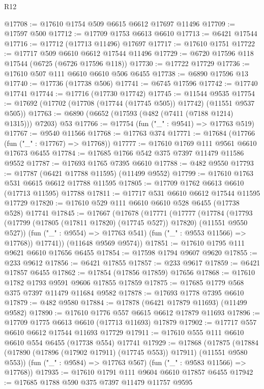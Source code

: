 \begin{lexlean}{R12}
\begin{coremodule}
{{{{{{{{{{{{{{{{{{{{{{{{{{{{{{{{{{{{{{{{{{{{{{{{{{{{{{{{{{{{{{{{{{{{{{{{{{{{{{{{{{@17708 := @17610 @1754 @509 @6615 @6612 @17697 @11496
@17709 := @17597 @500
@17712 := @17709 @1753 @6613 @6610
@17713 := @6421 @17544
@17716 := @17712 (@17713 @11496) @17697
@17717 := @17610 @1751
@17722 := @17717 @509 @6610 @6612 @17544 @11496
@17729 := @6720 @17596 @118 @17544 (@6725 (@6726 @17596 @118))
@17730 := @17722 @17729
@17736 := @17610 @507 @111 @6610 @6610 @506 @6455
@17738 := @6890 @17596 @13
@17740 := @17736 (@17738 @506)
@17741 := @6745 @17596
@17742 := @17740 @17741
@17744 := @17716 (@17730 @17742)
@17745 := @11544 @9535
@17754 := @17692 (@17702 (@17708 (@17744 (@17745 @505)) @17742) (@11551 @9537 @505))
@17763 := @6890 (@6652 (@17593 (@482 (@7411 (@7188 @1214) @1315))) @7203) @53
@17766 := @17754 (fun ("_" : @9541) => @17763 @519)
@17767 := @9540 @11566
@17768 := @17763 @374
@17771 := @17684 (@17766 (fun ("_" : @17767) => @17768))
@17777 := @17610 @1769 @111 @9561 @6610 @17673 @6455
@17784 := @17685 @1766 @542 @375 @7397 @11479 @11586 @9552
@17787 := @17693 @1765 @7395 @6610
@17788 := @482 @9550
@17793 := @17787 (@6421 @17788 @11595) (@11499 @9552)
@17799 := @17610 @1763 @531 @6615 @6612 @17788 @11595
@17805 := @17709 @1762 @6613 @6610 (@17713 @11595) @17788
@17811 := @17717 @531 @6610 @6612 @17544 @11595 @17729
@17820 := @17610 @529 @111 @6610 @6610 @528 @6455 (@17738 @528) @17741
@17845 := @17667
    (@17678
      (@17771
        (@17777
          (@17784
            (@17793 (@17799 (@17805 (@17811 @17820) (@17745 @527)) @17820) (@11551 @9550 @527))
            (fun ("_" : @9554) => @17763 @541)
            (fun ("_" : @9553 @11566) => @17768))
          @17741))
      (@11648 @9569 @9574))
@17851 := @17610 @1795 @111 @9621 @6610 @17656 @6455
@17854 := @17598 @1794 @9607 @9620
@17855 := @233 @9612
@17856 := @6421 @17855
@17857 := @233 @9617
@17859 := @6421 @17857 @6455
@17862 := @17854 (@17856 @17859) @17656
@17868 := @17610 @1782 @1793 @9591 @9606 @17855 @17859
@17875 := @17685 @1779 @568 @375 @7397 @11479 @11684 @9582
@17878 := @17693 @1778 @7395 @6610
@17879 := @482 @9580
@17884 := @17878 (@6421 @17879 @11693) (@11499 @9582)
@17890 := @17610 @1776 @557 @6615 @6612 @17879 @11693
@17896 := @17709 @1775 @6613 @6610 (@17713 @11693) @17879
@17902 := @17717 @557 @6610 @6612 @17544 @11693 @17729
@17911 := @17610 @555 @111 @6610 @6610 @554 @6455 (@17738 @554) @17741
@17929 := @17868
    (@17875
      (@17884 (@17890 (@17896 (@17902 @17911) (@17745 @553)) @17911) (@11551 @9580 @553))
      (fun ("_" : @9584) => @17763 @567)
      (fun ("_" : @9583 @11566) => @17768))
@17935 := @17610 @1791 @111 @9604 @6610 @17857 @6455
@17942 := @17685 @1788 @590 @375 @7397 @11479 @11757 @9595
}}}}}}}}}}}}}}}}}}}}}}}}}}}}}}}}}}}}}}}}}}}}}}}}}}}}}}}}}}}}}}}}}}}}}}}}}}}}}}}}}}
\end{coremodule}
\end{lexlean}
